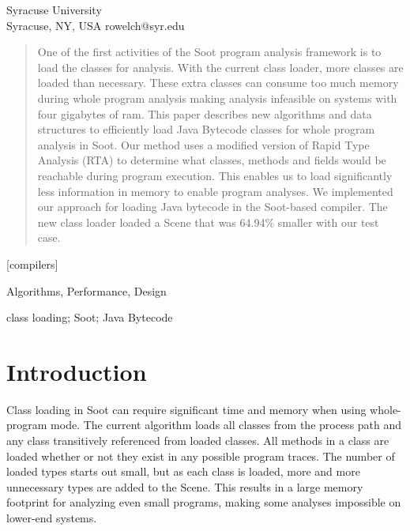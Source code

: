 \documentclass{sigplanconf}
\begin{document}
           {Syracuse University\\Syracuse, NY, USA}
           {rowelch@syr.edu}       
    
           

\maketitle

\begin{abstract}
One of the first activities of the Soot program analysis framework is to load 
the classes for analysis. With the current class loader, more classes are loaded
than necessary. These extra classes can consume too much memory during whole program
analysis making analysis infeasible on systems with four gigabytes of ram. This paper 
describes new algorithms and data structures to efficiently load Java
Bytecode classes for whole program analysis in Soot. Our method uses a modified 
version of Rapid Type Analysis (RTA) to determine what classes, methods and 
fields would be reachable during program execution. This enables us to load 
significantly less information in memory to enable program analyses.
We implemented our approach for loading Java bytecode in the Soot-based \rb 
compiler. The new class loader loaded a Scene that was 64.94\% smaller with
our test case.
\end{abstract}

[compilers]

\terms
Algorithms, Performance, Design

\keywords
class loading; Soot; Java Bytecode

\section{Introduction}
\label{sec:intro}
Class loading in Soot \cite{soot-retro, soot-orig} can require significant time 
and memory when using whole-program mode. The current algorithm loads all 
classes from the process path and any class transitively referenced from loaded 
classes. All methods in a class are loaded whether or not they exist in any 
possible program traces. The number of loaded types starts out small, but as 
each class is loaded, more and more unnecessary types are added to the Scene. 
This results in a large memory footprint for analyzing even small programs, 
making some analyses impossible on lower-end systems.
\end{document}
